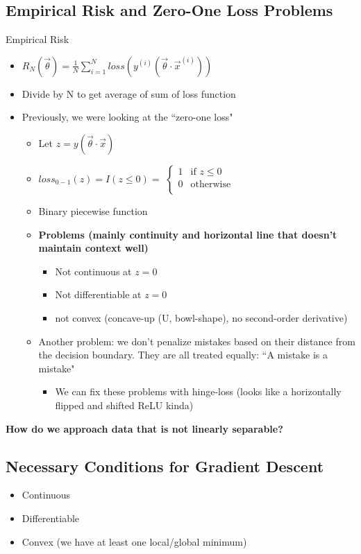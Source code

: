 \documentclass[10pt, oneside]{article}
\begin{document}
\subsection{Empirical Risk and Zero-One Loss Problems}
Empirical Risk
\begin{itemize}
    \item $R_N (\vec \theta) = \frac{1}{N} \sum_{i=1} ^N loss(y^{(i)}(\vec \theta \cdot \vec x ^{(i)}))$
    \item Divide by N to get average of sum of loss function
    \item Previously, we were looking at the ``zero-one loss"
    \begin{itemize}
        \item Let $z=y(\vec \theta \cdot \vec x)$
        \item $loss_{0-1} (z) = I(z\leq 0)= $ $ \begin{cases} 
          1 & \text{if } z \leq 0 \\
         0 & \text{otherwise} \\
        \end{cases}$
        \item Binary piecewise function
        \item \textbf{Problems (mainly continuity and horizontal line that doesn't maintain context well)}
        \begin{itemize}
            \item Not continuous at $z=0$
            \item Not differentiable at $z=0$
            \item not convex (concave-up (U, bowl-shape), no second-order derivative)
        \end{itemize}
        \item Another problem: we don't penalize mistakes based on their distance from the decision boundary. They are all treated equally: ``A mistake is a mistake"
        \begin{itemize}
            \item We can fix these problems with hinge-loss (looks like a horizontally flipped and shifted ReLU kinda)
        \end{itemize}
    \end{itemize}
\end{itemize}

\textbf{How do we approach data that is not linearly separable?}
\subsection{Necessary Conditions for Gradient Descent}
\begin{itemize}
    \item Continuous
    \item Differentiable
    \item Convex (we have at least one local/global minimum)
\end{itemize}
\end{document}
